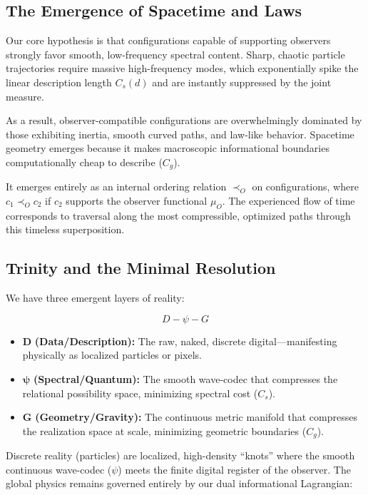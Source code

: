 \subsection*{The Emergence of Spacetime and Laws}

Our core hypothesis is that configurations capable of supporting observers strongly favor smooth, low-frequency spectral content.
Sharp, chaotic particle trajectories require massive high-frequency modes, which exponentially spike the linear description length $C_s(d)$ and are instantly suppressed by the joint measure. 

As a result, observer-compatible configurations are overwhelmingly dominated by those exhibiting inertia, smooth curved paths, and law-like behavior.
Spacetime geometry emerges because it makes macroscopic informational boundaries computationally cheap to describe ($C_g$). 

It emerges entirely as an internal ordering relation $\prec_O$ on configurations, where $c_1 \prec_O c_2$ if $c_2$ supports the observer functional $\mu_O$.
The experienced flow of time corresponds to traversal along the most compressible, optimized paths through this timeless superposition.



\subsection*{Trinity and the Minimal Resolution}

We have three emergent layers of reality:

\[
D-\psi-G
\]

\begin{itemize}
    \item $\mathbf{D}$ \textbf{(Data/Description):} The raw, naked, discrete digital—manifesting physically as localized particles or pixels. 
    \item $\boldsymbol{\psi}$ \textbf{(Spectral/Quantum):} The smooth wave-codec that compresses the relational possibility space, minimizing spectral cost ($C_s$).
    \item $\mathbf{G}$ \textbf{(Geometry/Gravity):} The continuous metric manifold that compresses the realization space at scale, minimizing geometric boundaries ($C_g$).
\end{itemize}

Discrete reality (particles) are localized, high-density ``knots'' where the smooth continuous wave-codec ($\psi$) meets the finite digital register of the observer.
The global physics remains governed entirely by our dual informational Lagrangian:

